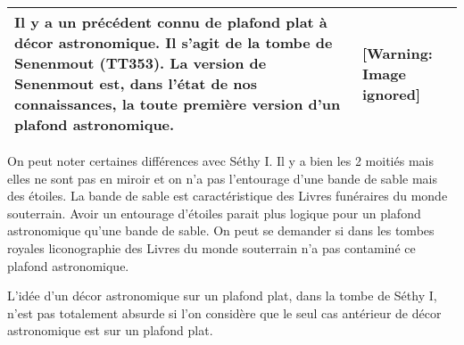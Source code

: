 \documentclass{article}
\begin{document}
\begin{flushleft}
\tablehead{}
\begin{supertabular}{|m{7.559cm}|m{10.431cm}|}
\hline
Il y a un précédent connu de plafond plat à décor astronomique. Il
s’agit de la tombe de Senenmout (TT353). La version de Senenmout est,
dans l’état de nos connaissances, la toute première version d’un
plafond astronomique.

 &
  [Warning: Image ignored] %
 \\\hline
\end{supertabular}
\end{flushleft}
On peut noter certaines différences avec Séthy I. Il y a bien les 2
moitiés mais elles ne sont pas en miroir et on n’a pas l’entourage
d’une bande de sable mais des étoiles.  La bande de sable est
caractéristique des Livres funéraires du monde souterrain. Avoir un
entourage d’étoiles parait plus logique pour un plafond astronomique
qu’une bande de sable. On peut se demander si dans les tombes royales
l{\textquotesingle}iconographie des Livres du monde souterrain n’a pas
contaminé ce plafond astronomique.

\begin{figure}[htp]

\end{figure}
L’idée d’un décor astronomique sur un plafond plat, dans la tombe de
Séthy I, n’est pas totalement absurde si l’on considère que le seul cas
antérieur de décor astronomique est sur un plafond plat.
\end{document}
